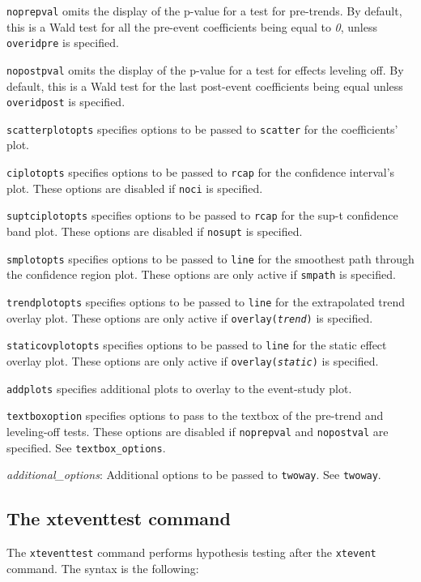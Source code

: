 \documentclass[12pt]{article}
\begin{document}
\hangpara
\texttt{noprepval} omits the display of the p-value for a test for pre-trends.
By default, this is a Wald test for all the pre-event coefficients being equal to {\it 0}, unless \texttt{overidpre} is specified.

\hangpara
\texttt{nopostpval} omits the display of the p-value for a test for effects leveling off.
By default, this is a Wald test for the last post-event coefficients being equal unless \texttt{overidpost} is specified.

\hangpara
\texttt{scatterplotopts} specifies options to be passed to \texttt{scatter} for the coefficients' plot.

\hangpara
\texttt{ciplotopts} specifies options to be passed to \texttt{rcap} for the confidence interval's plot.
These options are disabled if \texttt{noci} is specified.

\hangpara
\texttt{suptciplotopts} specifies options to be passed to \texttt{rcap} for the sup-t confidence band plot.
These options are disabled if \texttt{nosupt} is specified.

\hangpara
\texttt{smplotopts} specifies options to be passed to \texttt{line} for the smoothest path through the confidence region plot.
These options are only active if \texttt{smpath} is specified.

\hangpara
\texttt{trendplotopts} specifies options to be passed to \texttt{line} for the extrapolated trend overlay plot.
These options are only active if \texttt{overlay({\it trend})} is specified.

\hangpara
\texttt{staticovplotopts} specifies options to be passed to \texttt{line} for the static effect overlay plot.
These options are only active if \texttt{overlay({\it static})} is specified.

\hangpara
\texttt{addplots} specifies additional plots to overlay to the event-study plot.

\hangpara
\texttt{textboxoption} specifies options to pass to the textbox of the pre-trend and leveling-off tests.
These options are disabled if \texttt{noprepval} and \texttt{nopostval} are specified.
See \texttt{textbox\_options}.

\hangpara
{\it additional\_options}: Additional options to be passed to \texttt{twoway}.
See \texttt{twoway}.

\subsection{The xteventtest command}
The \texttt{xteventtest} command performs hypothesis testing after the \texttt{xtevent} command. The syntax is the following:
\end{document}
